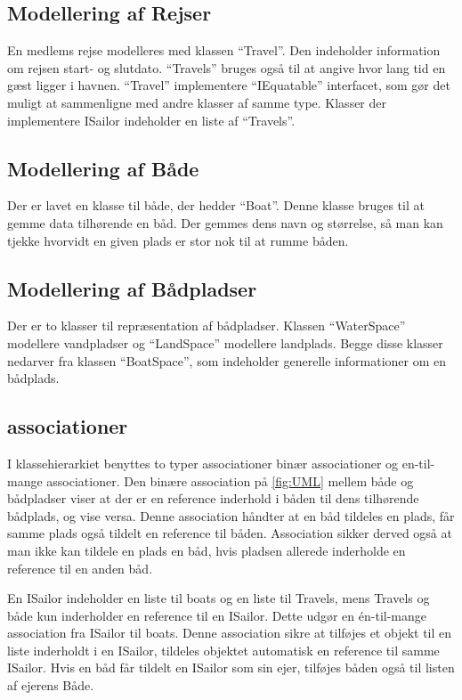 \subsection{Modellering af Rejser}
\label{sub:rejser}

En medlems rejse modelleres med klassen \enquote{Travel}. Den indeholder information om rejsen start- og slutdato. \enquote{Travels} bruges også til at angive hvor lang tid en gæst ligger i havnen. \enquote{Travel} implementere \enquote{IEquatable} interfacet, som gør det muligt at sammenligne med andre klasser af samme type. Klasser der implementere ISailor indeholder en liste af \enquote{Travels}.
 
\subsection{Modellering af Både}
\label{sub:bade}

Der er lavet en klasse til både, der hedder \enquote{Boat}. Denne klasse bruges til at gemme data tilhørende en båd. Der gemmes dens navn og størrelse, så man kan tjekke hvorvidt en given plads er stor nok til at rumme båden.

\subsection{Modellering af Bådpladser}
\label{sub:pladser}

Der er to klasser til repræsentation af bådpladser. Klassen \enquote{WaterSpace} modellere vandpladser og \enquote{LandSpace} modellere landplads. Begge disse klasser nedarver fra klassen \enquote{BoatSpace}, som indeholder generelle informationer om en bådplads. 

\subsection{associationer}
\label{sub:associationer}

I klassehierarkiet benyttes to typer associationer binær associationer og en-til-mange associationer. Den binære association på \cref{fig:UML} mellem både og bådpladser viser at der er en reference inderhold i båden til dens tilhørende bådplads, og vise versa. Denne association håndter at en båd tildeles en plads, får samme plads også tildelt en reference til båden. Association sikker derved også at man ikke kan tildele en plads en båd, hvis pladsen allerede inderholde en reference til en anden båd. 

En ISailor indeholder en liste til boats og en liste til Travels, mens Travels og både kun inderholder en reference til en ISailor. Dette udgør en én-til-mange association fra ISailor til boats. Denne association sikre at tilføjes et objekt til en liste inderholdt i en ISailor, tildeles objektet automatisk en reference til samme ISailor. Hvis en båd får tildelt en ISailor som sin ejer, tilføjes båden også til listen af ejerens Både. 


